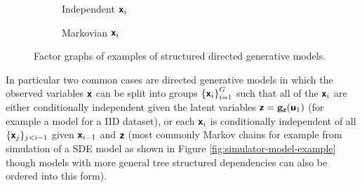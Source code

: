 \begin{figure}[!t]
\centering
\begin{subfigure}[t]{.35\linewidth}
\centering
{}
\caption{Independent $\boldsymbol{\mathsf{x}}_i$}\label{sfig:directed-model-independent}
\end{subfigure}%
\begin{subfigure}[t]{.62\linewidth}
\centering
{}
\caption{Markovian $\boldsymbol{\mathsf{x}}_i$}\label{sfig:directed-model-markov}
\end{subfigure}%
\caption[Structured directed generative models.]{Factor graphs of examples of structured directed generative models.}
\label{fig:directed-model-structure-examples}
\end{figure}

In particular two common cases are directed generative models in which the observed variables $\boldsymbol{\mathsf{x}}$ can be split into groups $\fset{\rvct{x}_i}_{i=1}^G$ such that all of the $\boldsymbol{\mathsf{x}}_i$ are either conditionally independent given the latent variables $\boldsymbol{\mathsf{z}} = {\mathbf{g}}_{\boldsymbol{\mathsf{z}}}(\boldsymbol{\mathsf{u}}_1)$ (for example a model for a \acs{IID} dataset), or each $\boldsymbol{\mathsf{x}}_i$ is conditionally independent of all $\lbrace \boldsymbol{\mathsf{x}}_j \rbrace_{j<i-1}$ given $\boldsymbol{\mathsf{x}}_{i-1}$ and $\boldsymbol{\mathsf{z}}$ (most commonly Markov chains for example from simulation of a \acs{SDE} model as shown in Figure \ref{fig:simulator-model-example} though models with more general tree structured dependencies can also be ordered into this form). 

